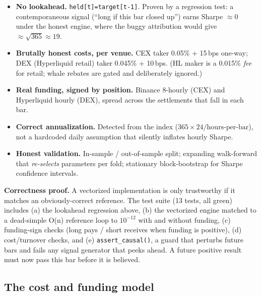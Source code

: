 \documentclass[11pt,a4paper]{article}
\begin{document}
\begin{itemize}
\item \textbf{No lookahead.} \texttt{held[t]=target[t-1]}. Proven by a regression test: a contemporaneous signal (``long if this bar closed up'') earns Sharpe $\approx 0$ under the honest engine, where the buggy attribution would give $\approx\sqrt{365}\approx 19$.
\item \textbf{Brutally honest costs, per venue.} CEX taker 0.05\% + 15\,bps one-way; DEX (Hyperliquid retail) taker 0.045\% + 10\,bps. (HL maker is a 0.015\% \emph{fee} for retail; whale rebates are gated and deliberately ignored.)
\item \textbf{Real funding, signed by position.} Binance 8-hourly (CEX) and Hyperliquid hourly (DEX), spread across the settlements that fall in each bar.
\item \textbf{Correct annualization.} Detected from the index ($365\times24/\text{hours-per-bar}$), not a hardcoded daily assumption that silently inflates hourly Sharpe.
\item \textbf{Honest validation.} In-sample / out-of-sample split; expanding walk-forward that \emph{re-selects} parameters per fold; stationary block-bootstrap for Sharpe confidence intervals.
\end{itemize}

\textbf{Correctness proof.} A vectorized implementation is only trustworthy if it matches an obviously-correct reference. The test suite (13 tests, all green) includes (a) the lookahead regression above, (b) the vectorized engine matched to a dead-simple O(n) reference loop to $10^{-12}$ with and without funding, (c) funding-sign checks (long pays / short receives when funding is positive), (d) cost/turnover checks, and (e) \texttt{assert\_causal()}, a guard that perturbs future bars and fails any signal generator that peeks ahead. A future positive result must now pass this bar before it is believed.

\subsection{The cost and funding model}
\end{document}
